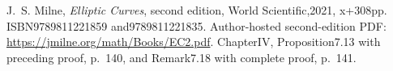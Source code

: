 J.~S. Milne, \emph{Elliptic Curves}, second edition,
World Scientific,2021, x+308pp.
ISBN9789811221859 and9789811221835.
Author-hosted second-edition PDF:
\url{https://jmilne.org/math/Books/EC2.pdf}.
ChapterIV, Proposition7.13 with preceding proof, p.~140,
and Remark7.18 with complete proof, p.~141.


